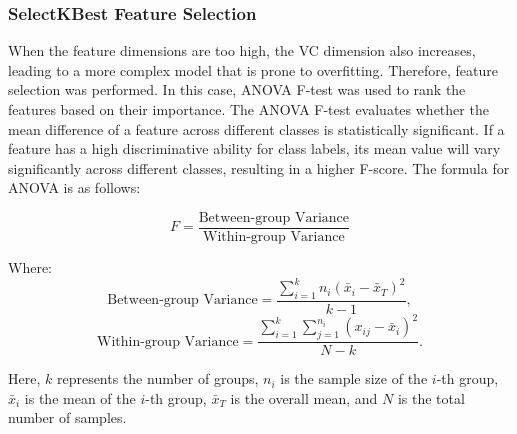 \documentclass[12pt,a4paper]{article}
\begin{document}
\subsubsection{SelectKBest Feature Selection}  

When the feature dimensions are too high, the VC dimension also increases, leading to a more complex model that is prone to overfitting. Therefore, feature selection was performed. In this case, ANOVA F-test was used to rank the features based on their importance. The ANOVA F-test evaluates whether the mean difference of a feature across different classes is statistically significant. If a feature has a high discriminative ability for class labels, its mean value will vary significantly across different classes, resulting in a higher F-score. The formula for ANOVA is as follows:

\[
F = \frac{\text{Between-group Variance}}{\text{Within-group Variance}}
\]

Where:
\[
\text{Between-group Variance} = \frac{\sum_{i=1}^{k} n_i (\bar{x}_i - \bar{x}_T)^2}{k-1},
\]
\[
\text{Within-group Variance} = \frac{\sum_{i=1}^{k} \sum_{j=1}^{n_i} (x_{ij} - \bar{x}_i)^2}{N-k}.
\]

Here, \( k \) represents the number of groups, \( n_i \) is the sample size of the \( i \)-th group, \( \bar{x}_i \) is the mean of the \( i \)-th group, \( \bar{x}_T \) is the overall mean, and \( N \) is the total number of samples.




\end{document}
